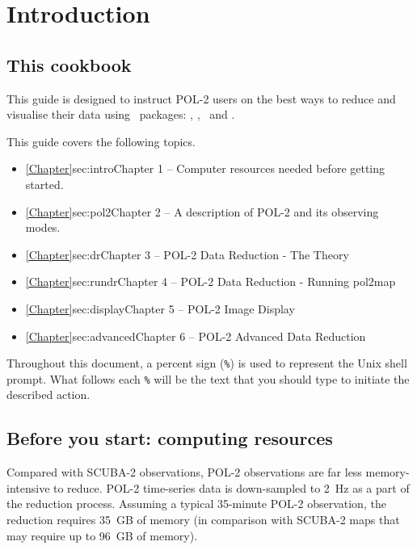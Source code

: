 \chapter{Introduction}
\label{sec:intro}

\renewcommand{\thepage}{\arabic{page}}
\setcounter{page}{1}

\section{This cookbook}

This guide is designed to instruct POL-2 users on the best ways to
reduce and visualise their data using \starlink\ packages: \smurf
\cite{smurf}, \Kappa, \polpack\ and \gaia.

This guide covers the following topics.
\begin{itemize}
\itemsep0em
\item \cref{Chapter}{sec:intro}{Chapter 1} -- Computer resources needed before getting started.
\item \cref{Chapter}{sec:pol2}{Chapter 2} -- A description of POL-2 and its observing modes.
\item \cref{Chapter}{sec:dr}{Chapter 3} -- POL-2 Data Reduction - The Theory
\item \cref{Chapter}{sec:rundr}{Chapter 4} -- POL-2 Data Reduction - Running pol2map
\item \cref{Chapter}{sec:display}{Chapter 5} -- POL-2 Image Display
\item \cref{Chapter}{sec:advanced}{Chapter 6} -- POL-2 Advanced Data Reduction

\end{itemize}

Throughout this document, a percent sign (\texttt{\%}) is used to
represent the Unix shell prompt. What follows each \texttt{\%} will be
the text that you should type to initiate the described action.

\section{ Before you start: computing resources}
\label{sec:computing}

Compared with SCUBA-2 observations, POL-2 observations are far less
memory-intensive to reduce. POL-2 time-series data is down-sampled to
2~Hz as a part of the reduction process. Assuming a typical 35-minute
POL-2 observation, the reduction requires 35~GB of memory (in
comparison with SCUBA-2 maps that may require up to 96~GB of memory).

